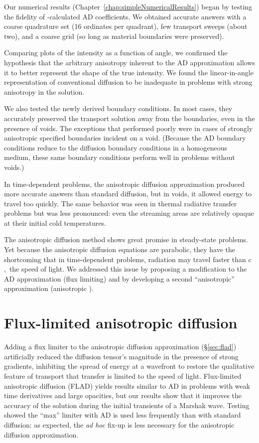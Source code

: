 Our numerical results (Chapter~\ref{chap:simpleNumericalResults}) began by
testing the fidelity of \SN-calculated AD coefficients. We obtained accurate
answers with a coarse quadrature set (16 ordinates per quadrant), few
transport sweeps (about two), and a coarse grid (so long as material boundaries
were preserved).

Comparing plots of the intensity as a function of angle, we confirmed the
hypothesis that the arbitrary anisotropy inherent to the AD approximation
allows it to better represent the shape of the true intensity. We found
the linear-in-angle representation of conventional diffusion to be inadequate
in problems with strong anisotropy in the solution.

We also tested the newly derived boundary conditions. In most cases, they
accurately preserved the transport solution away from the boundaries, even in
the presence of voids. The exceptions that performed poorly were in cases of
strongly anisotropic specified boundaries incident on a void. (Because the AD
boundary
conditions reduce to the diffusion boundary conditions in a homogeneous medium,
these same boundary conditions perform well in problems without voids.)

In time-dependent problems, the anisotropic diffusion approximation produced
more accurate answers than standard diffusion, but in voids, it allowed energy
to travel too quickly. The same behavior was seen in thermal radiative transfer
problems but was less pronounced: even the streaming areas are
relatively opaque at their initial cold temperatures.

The anisotropic diffusion method shows great promise in steady-state problems.
Yet because the anisotropic diffusion equations are parabolic, they have the
shortcoming that in time-dependent problems, radiation may travel faster than
$c$,~the speed of light. We addressed this issue by proposing a modification to
the AD approximation (flux limiting) and by developing a second ``anisotropic''
approximation (anisotropic \Pone).

\thesisclearpage
\section{Flux-limited anisotropic diffusion}

Adding a flux limiter to the anisotropic diffusion approximation
(\S\ref{sec:flad}) artificially reduced the diffusion tensor's magnitude in
the presence of strong gradients, inhibiting the spread of energy at a wavefront
to restore the qualitative feature of transport that transfer is limited to the
speed of light. Flux-limited anisotropic diffusion (FLAD) yields results
similar to AD in problems with weak time derivatives and large opacities, but
our results show that it improves the accuracy of the solution during the
initial transients of a Marshak wave.
Testing showed the ``max'' limiter with AD is used less frequently than with
standard diffusion: as expected, the \emph{ad hoc}
fix-up is less necessary for the anisotropic diffusion approximation.

